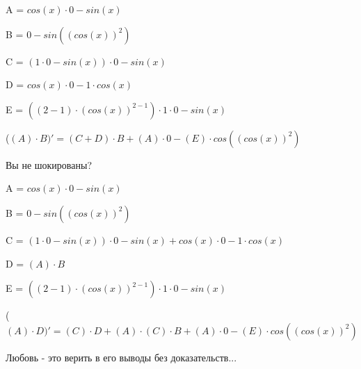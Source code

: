 \documentclass[12pt,a4paper,fleqn]{article}
\begin{document}
\begin{center}
A = $cos(x) \cdot 0-sin(x)$\end{center}
\begin{center}
B = $0-sin((cos(x))^{2})$\end{center}
\begin{center}
C = $(1 \cdot 0-sin(x)) \cdot 0-sin(x)$\end{center}
\begin{center}
D = $cos(x) \cdot 0-1 \cdot cos(x)$\end{center}
\begin{center}
E = $((2-1) \cdot (cos(x))^{2-1}) \cdot 1 \cdot 0-sin(x)$\end{center}
\begin{center}
 ($(A) \cdot B)'
  = (C+D) \cdot B+(A) \cdot 0-(E) \cdot cos((cos(x))^{2})$\end{center}
Вы не шокированы?\cite{link3}

\begin{center}
A = $cos(x) \cdot 0-sin(x)$\end{center}
\begin{center}
B = $0-sin((cos(x))^{2})$\end{center}
\begin{center}
C = $(1 \cdot 0-sin(x)) \cdot 0-sin(x)+cos(x) \cdot 0-1 \cdot cos(x)$\end{center}
\begin{center}
D = $(A) \cdot B$\end{center}
\begin{center}
E = $((2-1) \cdot (cos(x))^{2-1}) \cdot 1 \cdot 0-sin(x)$\end{center}
\begin{center}
 ($(A) \cdot D)'
  = (C) \cdot D+(A) \cdot (C) \cdot B+(A) \cdot 0-(E) \cdot cos((cos(x))^{2})$\end{center}
Любовь - это верить в его выводы без доказательств...
\end{document}

